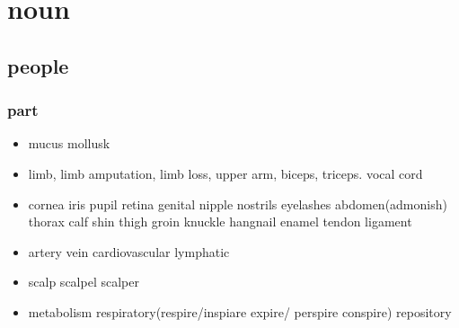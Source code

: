 \documentclass[a4paper,11pt,twoside]{book}
\begin{document}
\section{noun}
\subsection{people}

\subsubsection{part}
\begin{itemize}

	\item mucus mollusk
	
	\item limb, limb amputation, limb loss, upper arm, biceps, triceps. vocal cord 

	\item cornea iris pupil retina genital nipple nostrils eyelashes abdomen(admonish) thorax calf shin thigh groin knuckle hangnail enamel tendon ligament 

	\item artery vein cardiovascular lymphatic 

	\item scalp scalpel scalper

	\item metabolism  respiratory(respire/inspiare expire/ perspire conspire) repository

\end{itemize}
\end{document}
